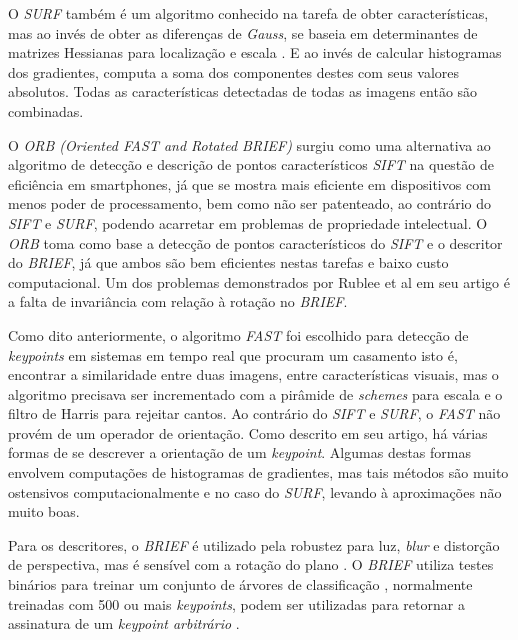 O \textit{SURF}\cite{SURF} também é um algoritmo conhecido na tarefa de obter características, mas ao invés de obter as diferenças de \textit{Gauss}, se baseia em determinantes de matrizes Hessianas para localização e escala \cite{Hessian}. E ao invés de calcular histogramas dos gradientes, computa a soma dos componentes destes com seus valores absolutos. Todas as características detectadas de todas as imagens então são combinadas.

O \textit{ORB (Oriented FAST and Rotated BRIEF)} surgiu como uma alternativa ao algoritmo de detecção e descrição de pontos característicos \textit{SIFT} na questão de eficiência em smartphones, já que se mostra mais eficiente em dispositivos com menos poder de processamento, bem como não ser patenteado, ao contrário do \textit{SIFT} e \textit{SURF}, podendo acarretar em problemas de propriedade intelectual. O \textit{ORB} toma como base a detecção de pontos característicos do \textit{SIFT} e o descritor do \textit{BRIEF}, já que ambos são bem eficientes nestas tarefas e baixo custo computacional. Um dos problemas demonstrados por Rublee et al\cite{ORB-Artigo} em seu artigo é a falta de invariância com relação à rotação no \textit{BRIEF}.

Como dito anteriormente, o algoritmo \textit{FAST} foi escolhido para detecção de \textit{keypoints} em sistemas em tempo real que procuram um casamento isto é, encontrar a similaridade entre duas imagens, entre características visuais, mas o algoritmo precisava ser incrementado com a pirâmide de \textit{schemes} para escala\cite{ORB-Artigo} e o filtro de Harris\cite{ORB-Artigo} para rejeitar cantos. Ao contrário do \textit{SIFT} e \textit{SURF}, o \textit{FAST} não provém de um operador de orientação. Como descrito em seu artigo, há várias formas de se descrever a orientação de um \textit{keypoint}. Algumas destas formas envolvem computações de histogramas de gradientes, mas tais métodos são muito ostensivos computacionalmente e no caso do \textit{SURF}, levando à aproximações não muito boas.

Para os descritores, o \textit{BRIEF} é utilizado pela robustez para luz, \textit{blur} e distorção de perspectiva, mas é sensível com a rotação do plano \cite{ORB-Artigo}. O \textit{BRIEF} utiliza testes binários para treinar um conjunto de árvores de classificação \cite{ORB-Artigo}, normalmente treinadas com 500 ou mais \textit{keypoints}, podem ser utilizadas para retornar a assinatura de um \textit{keypoint arbitrário} \cite{ORB-Artigo}.

